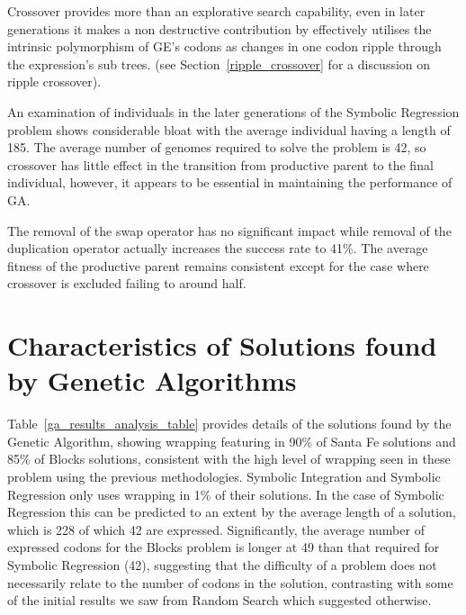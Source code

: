 Crossover provides more than an explorative search capability, even in later generations it makes a non destructive contribution by effectively utilises the intrinsic polymorphism of GE's codons as changes in one codon ripple through the expression's sub trees. (see Section~\ref{ripple_crossover} for a discussion on ripple crossover). 

 An examination of individuals in the later generations of the Symbolic Regression problem shows considerable bloat with the average individual having a length of 185. The average number of genomes required to solve the problem is 42, so crossover has little effect in the transition from productive parent to the final individual, however, it appears to be essential in maintaining the performance of GA. 

The removal of the swap operator has no significant impact while removal of the duplication operator actually increases the success rate to 41\%. The average fitness of the productive parent remains consistent except for the case where crossover is excluded failing to around half. 


\section{Characteristics of Solutions found by Genetic Algorithms}

Table~\ref{ga_results_analysis_table} provides details of the solutions found by the Genetic Algorithm, showing wrapping featuring in 90\% of Santa Fe solutions and 85\% of Blocks solutions, consistent with the high level of wrapping seen in these problem using the previous methodologies. Symbolic Integration and Symbolic Regression only uses wrapping in 1\% of their solutions. In the case of Symbolic Regression this can be predicted to an extent by the average length of a solution, which is 228 of which 42 are expressed. Significantly, the average number of expressed codons for the Blocks problem is longer at 49 than that required for Symbolic Regression (42), suggesting that the difficulty of a problem does not necessarily relate to the number of codons in the solution, contrasting with some of the initial results we saw from Random Search which suggested otherwise.

